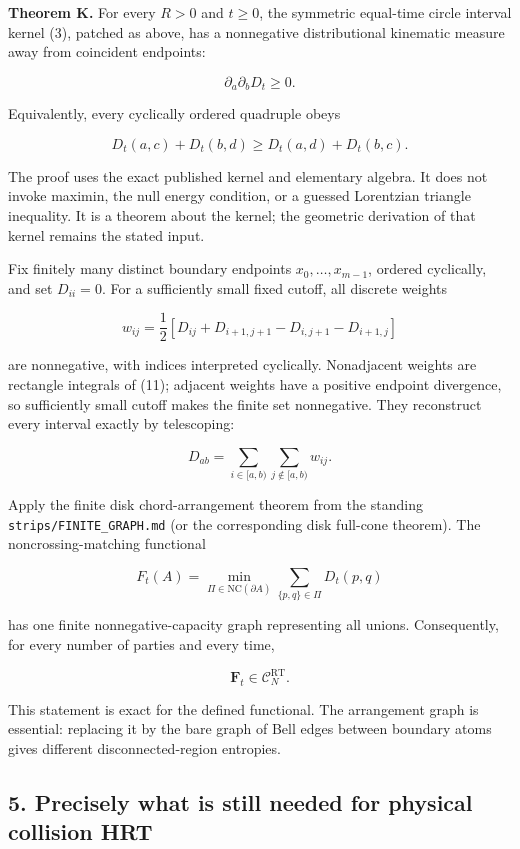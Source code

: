 \documentclass[11pt]{article}
\begin{document}
\textbf{Theorem K.} For every \(R>0\) and \(t\ge0\), the symmetric
equal-time circle interval kernel (3), patched as above, has a
nonnegative distributional kinematic measure away from coincident
endpoints:

\[
\boxed{\partial_a\partial_b D_t\ge0.}
\tag{11}
\]

Equivalently, every cyclically ordered quadruple obeys

\[
D_t(a,c)+D_t(b,d)\ge D_t(a,d)+D_t(b,c).
\tag{12}
\]

The proof uses the exact published kernel and elementary algebra. It
does not invoke maximin, the null energy condition, or a guessed
Lorentzian triangle inequality. It is a theorem about the kernel; the
geometric derivation of that kernel remains the stated input.

Fix finitely many distinct boundary endpoints \(x_0,\ldots,x_{m-1}\),
ordered cyclically, and set \(D_{ii}=0\). For a sufficiently small fixed
cutoff, all discrete weights

\[
w_{ij}=\frac12\left[D_{ij}+D_{i+1,j+1}-D_{i,j+1}-D_{i+1,j}\right]
\tag{13}
\]

are nonnegative, with indices interpreted cyclically. Nonadjacent
weights are rectangle integrals of (11); adjacent weights have a
positive endpoint divergence, so sufficiently small cutoff makes the
finite set nonnegative. They reconstruct every interval exactly by
telescoping:

\[
D_{ab}=\sum_{i\in[a,b)}\sum_{j\notin[a,b)}w_{ij}.
\tag{14}
\]

Apply the finite disk chord-arrangement theorem from the standing
\texttt{strips/FINITE\_\allowbreak GRAPH.md} (or the corresponding disk full-cone
theorem). The noncrossing-matching functional

\[
F_t(A)=\min_{\Pi\in\mathrm{NC}(\partial A)}
          \sum_{\{p,q\}\in\Pi}D_t(p,q)
\tag{15}
\]

has one finite nonnegative-capacity graph representing all unions.
Consequently, for every number of parties and every time,

\[
\boxed{\mathbf F_t\in\mathcal C_N^{\mathrm{RT}}.}
\tag{16}
\]

This statement is exact for the defined functional. The arrangement
graph is essential: replacing it by the bare graph of Bell edges between
boundary atoms gives different disconnected-region entropies.

\subsection{5. Precisely what is still needed for physical collision
HRT}\label{precisely-what-is-still-needed-for-physical-collision-hrt}
\end{document}

